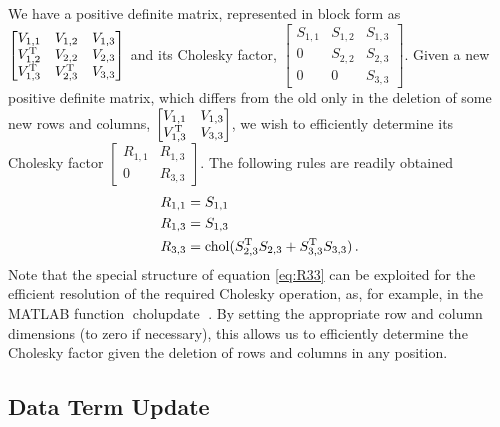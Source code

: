 \documentclass{acmtrans2m}
\begin{document}
\noindent We have a positive definite matrix, represented in block form as $\begin{bmatrix} V_{1,1} & V_{1,2} & V_{1,3} \\ V^{\mathrm{T}}_{1,2} & V_{2,2} & V_{2,3} \\ V^{\mathrm{T}}_{1,3} & V^{\mathrm{T}}_{2,3} & V_{3,3} \end{bmatrix}
$ and its Cholesky factor, $
\begin{bmatrix} S_{1,1} & S_{1,2} & S_{1,3} \\ 0 & S_{2,2} & S_{2,3} \\ 0 & 0 & S_{3,3} \end{bmatrix}
$. Given a new positive definite matrix, which differs from the old only in the deletion of some new rows and columns, $\begin{bmatrix} V_{1,1} & V_{1,3} \\ V^{\mathrm{T}}_{1,3} & V_{3,3} \end{bmatrix}$, we wish to efficiently determine its Cholesky factor $\begin{bmatrix} R_{1,1} & R_{1,3} \\ 0 & R_{3,3} \end{bmatrix}$. The following rules are readily obtained
\begin{align}
 R_{1,1}&=S_{1,1}\\
R_{1,3} &=S_{1,3}\\
R_{3,3}&=\operatorname{chol}(S^{\mathrm{T}}_{2,3}S_{2,3}+S^{\mathrm{T}}_{3,3}S_{3,3}) \label{eq:R33}\,.
\end{align}
Note that the special structure of equation \eqref{eq:R33} can be exploited for the efficient resolution of the required Cholesky operation, as, for example, in the MATLAB  function $\operatorname{cholupdate}$  \cite{Matlab}. By setting the appropriate row and column dimensions (to zero if necessary), this allows us to efficiently determine the Cholesky factor given the deletion of rows and columns in any position. 

\subsection{Data Term Update}
\end{document}
